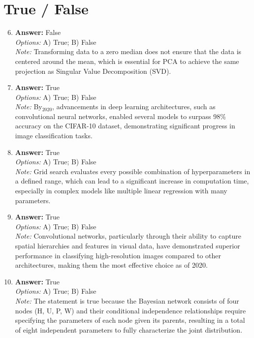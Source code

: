 \documentclass[12pt]{article}
\begin{document}
\section*{True / False}
\begin{enumerate}[label=\arabic*.]
\setcounter{enumi}{5}
\item \textbf{Answer:} False
\\ \textit{Options:} A) True; B) False
\\ \textit{Note:} Transforming data to a zero median does not ensure that the data is centered around the mean, which is essential for PCA to achieve the same projection as Singular Value Decomposition (SVD).
\item \textbf{Answer:} True
\\ \textit{Options:} A) True; B) False
\\ \textit{Note:} By$_{2020}$, advancements in deep learning architectures, such as convolutional neural networks, enabled several models to surpass 98\% accuracy on the CIFAR-10 dataset, demonstrating significant progress in image classification tasks.
\item \textbf{Answer:} True
\\ \textit{Options:} A) True; B) False
\\ \textit{Note:} Grid search evaluates every possible combination of hyperparameters in a defined range, which can lead to a significant increase in computation time, especially in complex models like multiple linear regression with many parameters.
\item \textbf{Answer:} True
\\ \textit{Options:} A) True; B) False
\\ \textit{Note:} Convolutional networks, particularly through their ability to capture spatial hierarchies and features in visual data, have demonstrated superior performance in classifying high-resolution images compared to other architectures, making them the most effective choice as of 2020.
\item \textbf{Answer:} True
\\ \textit{Options:} A) True; B) False
\\ \textit{Note:} The statement is true because the Bayesian network consists of four nodes (H, U, P, W) and their conditional independence relationships require specifying the parameters of each node given its parents, resulting in a total of eight independent parameters to fully characterize the joint distribution.
\end{enumerate}
\end{document}
